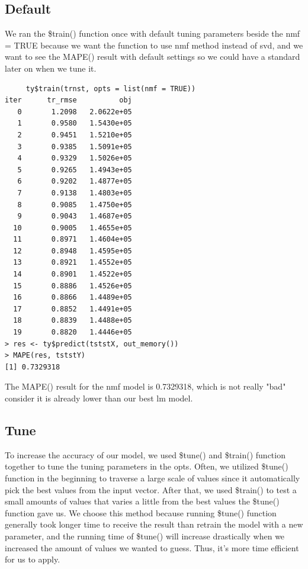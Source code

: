 \documentclass[11pt]{article}
\newcommand\tab[1][0.5cm]{\hspace*{#1}}
\begin{document}
\subsection{Default}
\tab{}We ran the \$train() function once with default tuning parameters beside the nmf = TRUE because we want the function to use nmf method instead of svd, and we want to see the MAPE() result with default settings so we could have a standard later on when we tune it.
\begin{verbatim}
     ty$train(trnst, opts = list(nmf = TRUE))
iter      tr_rmse          obj
   0       1.2098   2.0622e+05
   1       0.9580   1.5430e+05
   2       0.9451   1.5210e+05
   3       0.9385   1.5091e+05
   4       0.9329   1.5026e+05
   5       0.9265   1.4943e+05
   6       0.9202   1.4877e+05
   7       0.9138   1.4803e+05
   8       0.9085   1.4750e+05
   9       0.9043   1.4687e+05
  10       0.9005   1.4655e+05
  11       0.8971   1.4604e+05
  12       0.8948   1.4595e+05
  13       0.8921   1.4552e+05
  14       0.8901   1.4522e+05
  15       0.8886   1.4526e+05
  16       0.8866   1.4489e+05
  17       0.8852   1.4491e+05
  18       0.8839   1.4488e+05
  19       0.8820   1.4446e+05
> res <- ty$predict(tststX, out_memory())
> MAPE(res, tststY)
[1] 0.7329318
\end{verbatim}

\tab{}The MAPE() result for the nmf model is 0.7329318, which is not really "bad" consider it is already lower than our best lm model.

\subsection{Tune}
\tab{} To increase the accuracy of our model, we used \$tune() and \$train() function together to tune the tuning parameters in the opts. Often, we utilized \$tune() function in the beginning to traverse a large scale of values since it automatically pick the best values from the input vector. After that, we used \$train() to test a small amounts of values that varies a little from the best values the \$tune() function gave us. We choose this method because running \$tune() function generally took longer time to receive the result than retrain the model with a new parameter, and the running time of \$tune() will increase drastically when we increased the amount of values we wanted to guess. Thus, it's more time efficient for us to apply.
\end{document}
